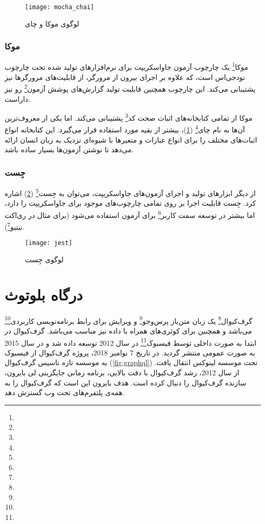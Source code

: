 \begin{figure}[H]
	\centering
	\texttt{[image: mocha\_chai]}
	\caption{لوگوی موکا و چای}
	\label{fig:mochachai}
\end{figure}


\subsubsection{موکا}

موکا\footnote{} یک چارچوب آزمون جاواسکریپت برای نرم‌افزارهای تولید شده تحت چارچوب نودجی‌اس است، که علاوه بر اجرای بیرون از مرورگر، از قابلیت‌های مرورگرها نیز پشتیبانی می‌کند. این چارچوب همچنین قابلیت تولید گزارش‌های پوشش آزمون\footnote{} رو نیز داراست\cite{wiki:mocha}.


موکا از تمامی کتابخانه‌های اثبات صحت کد\footnote{} پشتیبانی می‌کند. اما یکی از معروف‌ترین آن‌ها به نام چای\footnote{} (\cref{fig:mochachai})، بیشتر از بقیه مورد استفاده قرار می‌گیرد. این کتابخانه انواع اثبات‌های مختلف را برای انواع عبارات و متغیرها با شیوه‌ای نزدیک به زبان انسان ارائه می‌دهد تا نوشتن آزمون‌ها بسیار ساده باشد.


\subsubsection{جِست}

از دیگر ابزارهای تولید و اجرای آزمون‌های جاواسکریپت، می‌توان به جِست\footnote{} (\cref{fig:jest}) اشاره کرد. جِست قابلیت اجرا بر روی تمامی چارچوب‌های موجود برای جاواسکریپت را دارد، اما بیشتر در توسعه سمت کاربر\footnote{} برای آزمون استفاده می‌شود (برای مثال در ری‌اکت نیتیو\footnote{})\cite{jest}.

\begin{figure}[H]
	\centering
	\texttt{[image: jest]}
	\caption{لوگوی جِست}
	\label{fig:jest}
\end{figure}


\section{درگاه بلوتوث}


گرف‌کیوال\footnote{} یک زبان متن‌باز پرس‌وجو\footnote{} و ویرایش برای رابط برنامه‌نویسی کاربردی\footnote{} می‌باشد و همچنین برای کوئری‌های همراه با داده نیز مناسب می‌باشد. گرف‌کیوال در ابتدا به صورت داخلی توسط فیسبوک\footnote{} در سال 2012 توسعه داده شد و در سال 2015 به صورت عمومی منتشر گردید. در تاریخ 7 نوامبر 2018، پروژه گرف‌کیوال از فیسبوک به موسسه تازه تاسیس گرف‌کیوال (\cref{fig:graphql}) تحت موسسه لینوکس انتقال یافت. از سال 2012، رشد گرف‌کیوال با دقت بالایی، برنامه زمانی جایگزینی لی بایرون، سازنده گرف‌کیوال را دنبال کرده است. هدف بایرون این است که گرف‌کیوال را به همه‌ی پلتفرم‌های تحت وب گسترش دهد\cite{wiki:graphql}.

